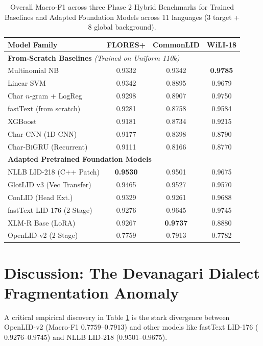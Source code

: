 \documentclass[11pt]{article}
\begin{document}
\begin{table}[t]
\centering
\small
\setlength{\tabcolsep}{3.5pt}
\caption{Overall Macro-F1 across three Phase 2 Hybrid Benchmarks for Trained Baselines and Adapted Foundation Models across 11 languages (3 target + 8 global background).}
\label{tab:sota_overall_summary}
\begin{tabular}{l ccc}
\toprule
\textbf{Model Family} & \textbf{FLORES+} & \textbf{CommonLID} & \textbf{WiLI-18} \\
\midrule
\multicolumn{4}{l}{\textbf{From-Scratch Baselines} \textit{(Trained on Uniform 110k)}} \\
Multinomial NB & 0.9332 & 0.9342 & \textbf{0.9785} \\
Linear SVM & 0.9342 & 0.8895 & 0.9679 \\
Char $n$-gram + LogReg & 0.9298 & 0.8907 & 0.9750 \\
fastText (from scratch) & 0.9281 & 0.8758 & 0.9584 \\
XGBoost & 0.9181 & 0.8734 & 0.9215 \\
Char-CNN (1D-CNN) & 0.9177 & 0.8398 & 0.8790 \\
Char-BiGRU (Recurrent) & 0.9111 & 0.8166 & 0.8770 \\
\midrule
\multicolumn{4}{l}{\textbf{Adapted Pretrained Foundation Models}} \\
NLLB LID-218 (C++ Patch) & \textbf{0.9530} & 0.9501 & 0.9675 \\
GlotLID v3 (Vec Transfer) & 0.9465 & 0.9527 & 0.9570 \\
ConLID (Head Ext.) & 0.9329 & 0.9261 & 0.9688 \\
fastText LID-176 (2-Stage) & 0.9276 & 0.9645 & 0.9745 \\
XLM-R Base (LoRA) & 0.9267 & \textbf{0.9737} & 0.8880 \\
OpenLID-v2 (2-Stage) & 0.7759 & 0.7913 & 0.7782 \\
\bottomrule
\end{tabular}
\end{table}

\section{Discussion: The Devanagari Dialect Fragmentation Anomaly}

A critical empirical discovery in Table \ref{tab:sota_overall_summary} is the stark divergence between OpenLID-v2 (Macro-F1 $0.7759$--$0.7913$) and other models like fastText LID-176 ($0.9276$--$0.9745$) and NLLB LID-218 ($0.9501$--$0.9675$).
\end{document}
